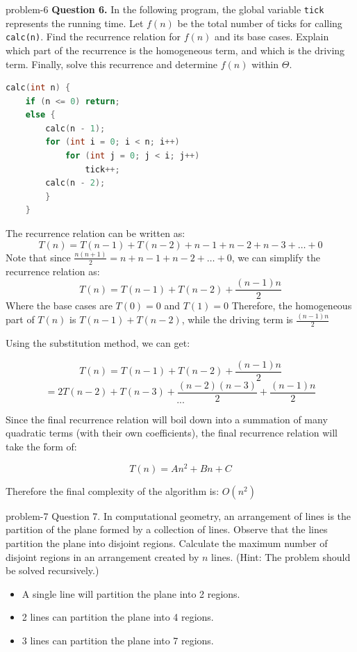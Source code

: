 \documentclass[letterpaper, 11pt]{extarticle}
\begin{document}
\begin{problem}{}{problem-6}
    \noindent \textbf{Question 6.} In the following program, the global variable \texttt{tick} represents the running time. Let $f(n)$ be the total number of ticks for calling \texttt{calc(n)}. Find the recurrence relation for $f(n)$ and its base cases. Explain which part of the recurrence is the homogeneous term, and which is the driving term. Finally, solve this recurrence and determine $f(n)$ within $\Theta$.

    \begin{lstlisting}[language=C, basicstyle=\small\ttfamily]
    calc(int n) {
    if (n <= 0) return;
    else {
        calc(n - 1);
        for (int i = 0; i < n; i++)
            for (int j = 0; j < i; j++)
                tick++;
        calc(n - 2);
        }
    }
    \end{lstlisting}
\end{problem}


The recurrence relation can be written as:
$$T(n) = T(n-1) + T(n-2) + n-1 + n-2 + n-3 + \dots + 0$$
Note that since $\frac{n(n+1)}{2} = n + n-1 + n-2 + \dots + 0$, we can simplify the recurrence relation as:
$$T(n) = T(n-1) + T(n-2) + \frac{(n-1)n}{2}$$
Where the base cases are $T(0) = 0$ and $T(1) =0$
Therefore, the homogeneous part of $T(n)$ is $T(n-1) + T(n-2)$, while the driving term is $\frac{(n-1)n}{2}$

Using the substitution method, we can get:

$$T(n) = T(n-1) + T(n-2) + \frac{(n-1)n}{2} $$
$$ = 2T(n-2) + T(n-3) + \frac{(n-2)(n-3)}{2} + \frac{(n-1)n}{2}$$
$$ ... $$

Since the final recurrence relation will boil down into a summation of many quadratic terms (with their own coefficients), the final recurrence relation will take the form of:

$$ T(n) = An^2 + Bn + C $$

Therefore the final complexity of the algorithm is: $O(n^2)$


\begin{problem}{}{problem-7}
    Question 7. In computational geometry, an arrangement of lines is the partition of the plane formed by a collection of lines. Observe that the lines partition the plane into disjoint regions. Calculate the maximum number of disjoint regions in an arrangement created by $n$ lines. (Hint: The problem should be solved recursively.)

    \begin{itemize}
        \item A single line will partition the plane into 2 regions.
        \item 2 lines can partition the plane into 4 regions.
        \item 3 lines can partition the plane into 7 regions.
    \end{itemize}
\end{problem}
\end{document}
